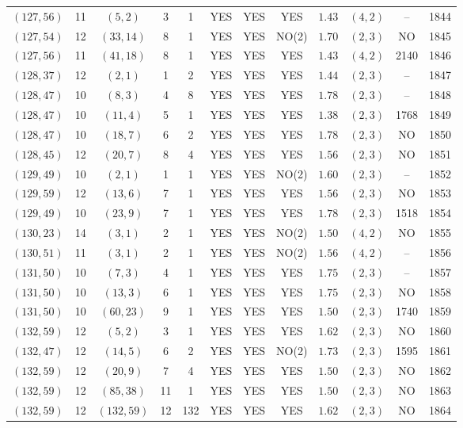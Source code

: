 \begin{longtable}{|c|c|c|c|c|c|c|c|c|c|c|c|}
$(127,56)$ & 11 & $(5,2)$ & 3 & 1 & YES & YES & YES & $1.43$ & $(4,2)$ & -- & 1844\\
$(127,54)$ & 12 & $(33,14)$ & 8 & 1 & YES & YES & NO(2) & $1.70$ & $(2,3)$ & NO & 1845\\
$(127,56)$ & 11 & $(41,18)$ & 8 & 1 & YES & YES & YES & $1.43$ & $(4,2)$ & 2140 & 1846\\
$(128,37)$ & 12 & $(2,1)$ & 1 & 2 & YES & YES & YES & $1.44$ & $(2,3)$ & -- & 1847\\
$(128,47)$ & 10 & $(8,3)$ & 4 & 8 & YES & YES & YES & $1.78$ & $(2,3)$ & -- & 1848\\
$(128,47)$ & 10 & $(11,4)$ & 5 & 1 & YES & YES & YES & $1.38$ & $(2,3)$ & 1768 & 1849\\
$(128,47)$ & 10 & $(18,7)$ & 6 & 2 & YES & YES & YES & $1.78$ & $(2,3)$ & NO & 1850\\
$(128,45)$ & 12 & $(20,7)$ & 8 & 4 & YES & YES & YES & $1.56$ & $(2,3)$ & NO & 1851\\
$(129,49)$ & 10 & $(2,1)$ & 1 & 1 & YES & YES & NO(2) & $1.60$ & $(2,3)$ & -- & 1852\\
$(129,59)$ & 12 & $(13,6)$ & 7 & 1 & YES & YES & YES & $1.56$ & $(2,3)$ & NO & 1853\\
$(129,49)$ & 10 & $(23,9)$ & 7 & 1 & YES & YES & YES & $1.78$ & $(2,3)$ & 1518 & 1854\\
$(130,23)$ & 14 & $(3,1)$ & 2 & 1 & YES & YES & NO(2) & $1.50$ & $(4,2)$ & NO & 1855\\
$(130,51)$ & 11 & $(3,1)$ & 2 & 1 & YES & YES & NO(2) & $1.56$ & $(4,2)$ & -- & 1856\\
$(131,50)$ & 10 & $(7,3)$ & 4 & 1 & YES & YES & YES & $1.75$ & $(2,3)$ & -- & 1857\\
$(131,50)$ & 10 & $(13,3)$ & 6 & 1 & YES & YES & YES & $1.75$ & $(2,3)$ & NO & 1858\\
$(131,50)$ & 10 & $(60,23)$ & 9 & 1 & YES & YES & YES & $1.50$ & $(2,3)$ & 1740 & 1859\\
$(132,59)$ & 12 & $(5,2)$ & 3 & 1 & YES & YES & YES & $1.62$ & $(2,3)$ & NO & 1860\\
$(132,47)$ & 12 & $(14,5)$ & 6 & 2 & YES & YES & NO(2) & $1.73$ & $(2,3)$ & 1595 & 1861\\
$(132,59)$ & 12 & $(20,9)$ & 7 & 4 & YES & YES & YES & $1.50$ & $(2,3)$ & NO & 1862\\
$(132,59)$ & 12 & $(85,38)$ & 11 & 1 & YES & YES & YES & $1.50$ & $(2,3)$ & NO & 1863\\
$(132,59)$ & 12 & $(132,59)$ & 12 & 132 & YES & YES & YES & $1.62$ & $(2,3)$ & NO & 1864\\

\end{longtable}
